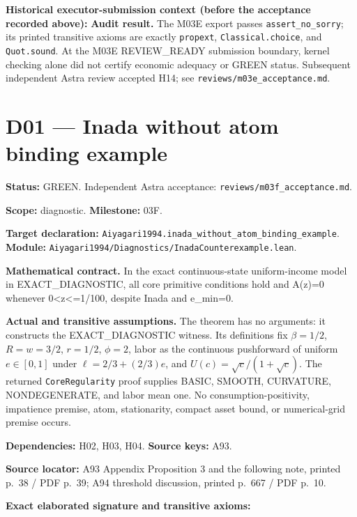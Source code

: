 \documentclass[
  11pt,
]{article}
\let\LedgerOriginalTexttt\texttt
\renewcommand{\texttt}[1]{{\small\LedgerOriginalTexttt{#1}}}
\begin{document}
\textbf{Historical executor-submission context (before the acceptance
recorded above):} \textbf{Audit result.} The M03E export passes
\texttt{assert\_no\_sorry}; its printed transitive axioms are exactly
\texttt{propext}, \texttt{Classical.choice}, and \texttt{Quot.sound}. At
the M03E REVIEW\_READY submission boundary, kernel checking alone did
not certify economic adequacy or GREEN status. Subsequent independent
Astra review accepted H14; see \texttt{reviews/m03e\_acceptance.md}.

\section{D01 --- Inada without atom binding
example}\label{d01-inada-without-atom-binding-example}

\textbf{Status:} GREEN. Independent Astra acceptance:
\texttt{reviews/m03f\_acceptance.md}.

\textbf{Scope:} diagnostic. \textbf{Milestone:} 03F.

\textbf{Target declaration:}
\texttt{Aiyagari1994.inada\_without\_atom\_binding\_example}.\\
\textbf{Module:}
\texttt{Aiyagari1994/Diagnostics/InadaCounterexample.lean}.

\textbf{Mathematical contract.} In the exact continuous-state
uniform-income model in EXACT\_DIAGNOSTIC, all core primitive conditions
hold and A(z)=0 whenever 0\textless z\textless=1/100, despite Inada and
e\_min=0.

\textbf{Actual and transitive assumptions.} The theorem has no
arguments: it constructs the EXACT\_DIAGNOSTIC witness. Its definitions
fix \(\beta=1/2\), \(R=w=3/2\), \(r=1/2\), \(\phi=2\), labor as the
continuous pushforward of uniform \(e\in[0,1]\) under
\(\ell=2/3+(2/3)e\), and \(U(c)=\sqrt c/(1+\sqrt c)\). The returned
\texttt{CoreRegularity} proof supplies BASIC, SMOOTH, CURVATURE,
NONDEGENERATE, and labor mean one. No consumption-positivity, impatience
premise, atom, stationarity, compact asset bound, or numerical-grid
premise occurs.

\textbf{Dependencies:} H02, H03, H04. \textbf{Source keys:} A93.

\textbf{Source locator:} A93 Appendix Proposition 3 and the following
note, printed p.~38 / PDF p.~39; A94 threshold discussion, printed
p.~667 / PDF p.~10.

\textbf{Exact elaborated signature and transitive axioms:}
\end{document}
